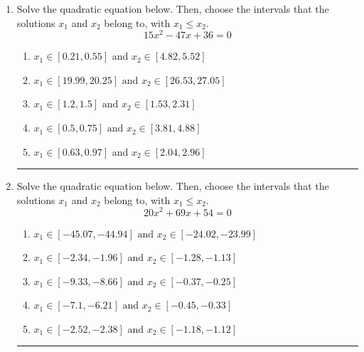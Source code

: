 \documentclass[14pt]{extbook}
\newcommand{\litem}[1]{\item#1\hspace*{-1cm}\rule{\textwidth}{0.4pt}}
\begin{document}
\begin{enumerate}
{\begin{enumerate}[label=\Alph*.]
\end{enumerate} }
\litem{
Solve the quadratic equation below. Then, choose the intervals that the solutions $x_1$ and $x_2$ belong to, with $x_1 \leq x_2$.\[ 15x^{2} -47 x + 36 = 0 \]\begin{enumerate}[label=\Alph*.]
\item \( x_1 \in [0.21, 0.55] \text{ and } x_2 \in [4.82, 5.52] \)
\item \( x_1 \in [19.99, 20.25] \text{ and } x_2 \in [26.53, 27.05] \)
\item \( x_1 \in [1.2, 1.5] \text{ and } x_2 \in [1.53, 2.31] \)
\item \( x_1 \in [0.5, 0.75] \text{ and } x_2 \in [3.81, 4.88] \)
\item \( x_1 \in [0.63, 0.97] \text{ and } x_2 \in [2.04, 2.96] \)

\end{enumerate} }
\litem{
Solve the quadratic equation below. Then, choose the intervals that the solutions $x_1$ and $x_2$ belong to, with $x_1 \leq x_2$.\[ 20x^{2} +69 x + 54 = 0 \]\begin{enumerate}[label=\Alph*.]
\item \( x_1 \in [-45.07, -44.94] \text{ and } x_2 \in [-24.02, -23.99] \)
\item \( x_1 \in [-2.34, -1.96] \text{ and } x_2 \in [-1.28, -1.13] \)
\item \( x_1 \in [-9.33, -8.66] \text{ and } x_2 \in [-0.37, -0.25] \)
\item \( x_1 \in [-7.1, -6.21] \text{ and } x_2 \in [-0.45, -0.33] \)
\item \( x_1 \in [-2.52, -2.38] \text{ and } x_2 \in [-1.18, -1.12] \)


\end{enumerate}}
\end{enumerate}
\end{document}
